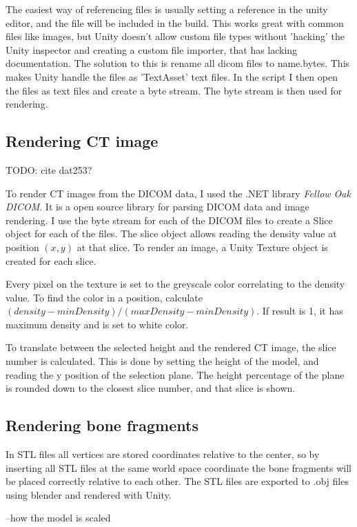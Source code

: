 \documentclass[a4paper]{report}
\begin{document}
The easiest way of referencing files is usually setting a reference in the unity editor, and the file will be included in the build. This works great with common files like images, but Unity doesn't allow custom file types without 'hacking' the Unity inspector and creating a custom file importer\cite{scriptedimporters_unity_nodate}, that has lacking documentation. The solution to this is rename all dicom files to {name}.bytes. This makes Unity handle the files as 'TextAsset' text files\cite{textassets_unity_nodate}. In the script I then open the files as text files and create a byte stream. The byte stream is then used for rendering.

\subsection{Rendering CT image}
TODO: cite dat253?

To render CT images from the DICOM data, I used the .NET library \emph{Fellow Oak DICOM}\cite{noauthor_fellow_2022}. It is a open source library for parsing DICOM data and image rendering.
I use the byte stream for each of the DICOM files to create a Slice object for each of the files. The slice object allows reading the density value at position $(x, y)$ at that slice. To render an image, a Unity Texture object is created for each slice.

Every pixel on the texture is set to the greyscale color correlating to the density value. To find the color in a position, calculate $(density-minDensity)/(maxDensity-minDensity)$. If result is 1, it has maximum density and is set to white color.

To translate between the selected height and the rendered CT image, the slice number is calculated. This is done by setting the height of the model, and reading the y position of the selection plane. The height percentage of the plane is rounded down to the closest slice number, and that slice is shown.


\subsection{Rendering bone fragments}
In STL files all vertices are stored coordinates relative to the center, so by inserting all STL files at the same world space coordinate the bone fragments will be placed correctly relative to each other. The STL files are exported to .obj files using blender and rendered with Unity.

--how the model is scaled
\end{document}
